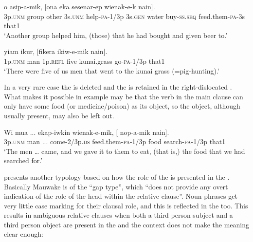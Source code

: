 \ea%
\label{ex:8:x1533}
\gll {}      o  asip-a-mik,  [ona  eka sesenar-ep  wienak-e-k  nain]. \\
3p.\textsc{unm} group  other  3s.\textsc{unm} help-\textsc{pa}-1/3p  3s.\textsc{gen} water buy-\textsc{ss}.\textsc{seq} feed.them-\textsc{pa}-3s that1\\
\glt`Another group helped him, (those) that he had bought and given beer to.'
\z


\ea%
\label{ex:8:x1534}
\gll {}   yiam  ikur,  [fikera  ikiw-e-mik  nain]. \\
1p.\textsc{unm} man 1p.\textsc{refl} five kunai.grass go-\textsc{pa}-1/3p that1\\
\glt`There were five of us men that went to the kunai grass (=pig-hunting).'
\z


In a very rare case the  is deleted and the  is retained in the right-dislocated . What makes it possible in example  may be that the verb in the main clause can only have some food (or medicine/poison) as its object, so the object, although usually present, may also be left out.

\ea%
\label{ex:8:x1535}
\gll Wi  mua  ...  ekap-iwkin  wienak-e-mik, [  nop-a-mik  nain].\\
3p.\textsc{unm} man  ...  come-2/3p.\textsc{ds} feed.them-\textsc{pa}-1/3p food  search-\textsc{pa}-1/3p  that1\\
\glt`The men {\dots} came, and we gave it to them to eat, (that is,) the food that we had searched for.'
\z


\citet[144--146]{Comrie1981} presents another typology based on how the role of the  is presented in the . Basically Mauwake is of the ``gap type'', which ``does not provide any overt indication of the role of the head within the relative clause''. Noun phrases get very little case marking for their clausal role, and this is reflected in the  too. This results in ambiguous relative clauses when both a third person subject  and a third person object  are present in the  and the context does not make the meaning clear enough:

